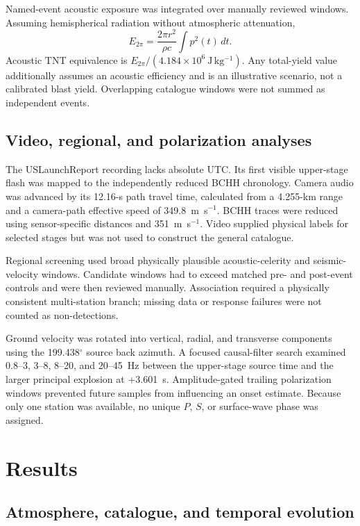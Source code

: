 \documentclass[]{seismica}
\begin{document}
Named-event acoustic exposure was integrated over manually reviewed windows.
Assuming hemispherical radiation without atmospheric attenuation,
\begin{equation}
 E_{2\pi}=\frac{2\pi r^2}{\rho c}\int p^2(t)\,dt.
 \label{eq:acoustic_energy}
\end{equation}
Acoustic TNT equivalence is $E_{2\pi}/(4.184\times10^6~\mathrm{J\,kg^{-1}})$.
Any total-yield value additionally assumes an acoustic efficiency and is an
illustrative scenario, not a calibrated blast yield. Overlapping catalogue
windows were not summed as independent events.

\subsection{Video, regional, and polarization analyses}

The USLaunchReport recording lacks absolute UTC. Its first visible upper-stage
flash was mapped to the independently reduced BCHH chronology. Camera audio
was advanced by its 12.16-s path travel time, calculated from a 4.255-km range
and a camera-path effective speed of 349.8~m~s$^{-1}$. BCHH traces were reduced
using sensor-specific distances and 351~m~s$^{-1}$. Video supplied physical
labels for selected stages but was not used to construct the general catalogue.

Regional screening used broad physically plausible acoustic-celerity and
seismic-velocity windows. Candidate windows had to exceed matched pre- and
post-event controls and were then reviewed manually. Association required a
physically consistent multi-station branch; missing data or response failures
were not counted as non-detections.

Ground velocity was rotated into vertical, radial, and transverse components
using the 199.438$^\circ$ source back azimuth. A focused causal-filter search
examined 0.8--3, 3--8, 8--20, and 20--45~Hz between the upper-stage source time
and the larger principal explosion at +3.601~s. Amplitude-gated trailing
polarization windows prevented future samples from influencing an onset
estimate. Because only one station was available, no unique $P$, $S$, or
surface-wave phase was assigned.

\section{Results}
\label{sec:results}

\subsection{Atmosphere, catalogue, and temporal evolution}
\end{document}
